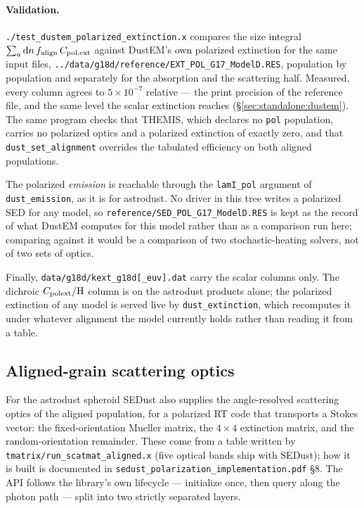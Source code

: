 \documentclass{my_memo}
\newcommand{\code}[1]{\texttt{#1}}
\begin{document}
\paragraph{Validation.} \code{./test\_dustem\_polarized\_extinction.x} compares
the size integral $\sum_a {\rm d}n\, f_{\rm align}\, C_{\rm pol,ext}$ against
DustEM's own polarized extinction for the same input files,
\code{../data/g18d/reference/EXT\_POL\_G17\_ModelD.RES}, population by
population and separately for the absorption and the scattering half. Measured,
every column agrees to $5\times10^{-7}$ relative --- the print precision of the
reference file, and the same level the scalar extinction reaches
(\S\ref{sec:standalone:dustem}). The same program checks that THEMIS, which
declares no \code{pol} population, carries no polarized optics and a polarized
extinction of exactly zero, and that \code{dust\_set\_alignment} overrides the
tabulated efficiency on both aligned populations.

The polarized \emph{emission} is reachable through the \code{lamI\_pol}
argument of \code{dust\_emission}, as it is for astrodust. No driver in this
tree writes a polarized SED for any model, so
\code{reference/SED\_POL\_G17\_ModelD.RES} is kept as the record of what DustEM
computes for this model rather than as a comparison run here; comparing against
it would be a comparison of two stochastic-heating solvers, not of two sets of
optics.

Finally, \code{data/g18d/kext\_g18d[\_euv].dat} carry the scalar columns only.
The dichroic $C_{\rm polext}/{\rm H}$ column is on the astrodust products alone;
the polarized extinction of any model is served live by
\code{dust\_extinction}, which recomputes it under whatever alignment the model
currently holds rather than reading it from a table.

\subsection{Aligned-grain scattering optics}\label{sec:pol:scatmat}

For the astrodust spheroid SEDust also supplies the angle-resolved scattering
optics of the aligned population, for a polarized RT code that transports a Stokes
vector: the fixed-orientation Mueller matrix, the $4\times4$ extinction matrix,
and the random-orientation remainder. These come from a table written by
\code{tmatrix/run\_scatmat\_aligned.x} (five optical bands ship with SEDust); how
it is built is documented in \code{sedust\_polarization\_implementation.pdf}
\S8. The API follows the library's own lifecycle --- initialize once, then query
along the photon path --- split into two strictly separated layers.
\end{document}
